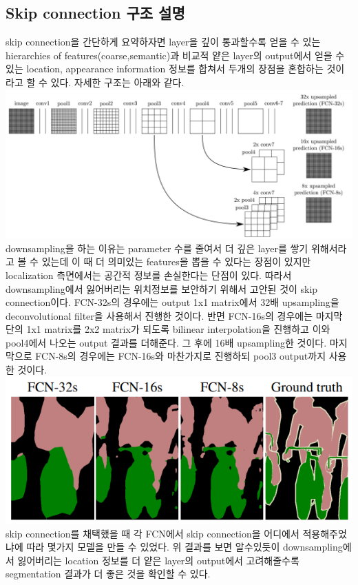 \documentclass[extendedabs]{bmvc2k}
\begin{document}
 \subsection{Skip connection 구조 설명}
 \quad skip connection을 간단하게 요약하자면 layer을 깊이 통과할수록 얻을 수 있는 hierarchies of features(coarse,semantic)과 비교적 얕은 layer의 output에서 얻을 수 있는 location, appearance information
 정보를 합쳐서 두개의 장점을 혼합하는 것이라고 할 수 있다. 자세한 구조는 아래와 같다. 
 \newline  \includegraphics[width=\linewidth]{images/01_FCN.PNG}
 \quad downsampling을 하는 이유는 parameter 수를 줄여서 더 깊은 layer를 쌓기 위해서라고 볼 수 있는데 이 때 더 의미있는 features을 뽑을 수 있다는 장점이 있지만 
 localization 측면에서는 공간적 정보를 손실한다는 단점이 있다. 따라서 downsampling에서 잃어버리는 위치정보를 보안하기 위해서 고안된 것이 skip connection이다. 
 FCN-32s의 경우에는 output 1x1 matrix에서 32배 upsampling을 deconvolutional filter을 사용해서 진행한 것이다. 반면 
 FCN-16s의 경우에는 마지막 단의 1x1 matrix를 2x2 matrix가 되도록 bilinear interpolation을 진행하고 이와 pool4에서 나오는 output 결과를 더해준다.
 그 후에 16배 upsampling한 것이다.
 마지막으로 FCN-8s의 경우에는 FCN-16s와 마찬가지로 진행하되 pool3 output까지 사용한 것이다.
 \newline  \includegraphics[width=\linewidth]{images/02_FCN.PNG}
 \quad skip connection를 채택했을 때 각 FCN에서 skip connection을 어디에서 적용해주었냐에 따라 몇가지 모델을 만들 수 있었다. 위 결과를 보면
 알수있듯이 downsampling에서 잃어버리는 location 정보를 더 얕은 layer의 output에서 고려해줄수록 segmentation 결과가 더 좋은 것을 확인할 수 있다.
\end{document}
